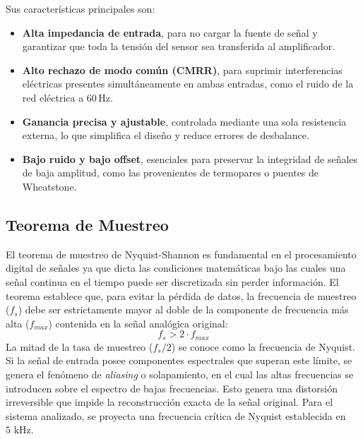 \documentclass[journal, onecolumn]{IEEEtran}
\begin{document}
Sus características principales son:

\begin{itemize}
    \item \textbf{Alta impedancia de entrada}, para no cargar la fuente de señal 
    y garantizar que toda la tensión del sensor sea transferida al amplificador.
    \item \textbf{Alto rechazo de modo común (CMRR)}, para suprimir interferencias 
    eléctricas presentes simultáneamente en ambas entradas, como el ruido de la 
    red eléctrica a 60\,Hz.
    \item \textbf{Ganancia precisa y ajustable}, controlada mediante una sola 
    resistencia externa, lo que simplifica el diseño y reduce errores de 
    desbalance.
    \item \textbf{Bajo ruido y bajo offset}, esenciales para preservar la 
    integridad de señales de baja amplitud, como las provenientes de termopares 
    o puentes de Wheatstone.
\end{itemize}

\subsection{Teorema de Muestreo}
El teorema de muestreo de Nyquist-Shannon es fundamental en el procesamiento digital de señales ya que dicta las condiciones matemáticas bajo las cuales una señal continua en el tiempo puede ser discretizada sin perder información. El teorema establece que, para evitar la pérdida de datos, la frecuencia de muestreo ($f_s$) debe ser estrictamente mayor al doble de la componente de frecuencia más alta ($f_{max}$) contenida en la señal analógica original:
\begin{equation}
    f_s > 2 \cdot f_{max}
\end{equation}
La mitad de la tasa de muestreo ($f_s / 2$) se conoce como la frecuencia de Nyquist. Si la señal de entrada posee componentes espectrales que superan este límite, se genera el fenómeno de \textit{aliasing} o solapamiento, en el cual las altas frecuencias se introducen sobre el espectro de bajas frecuencias. Esto genera una distorsión irreversible que impide la reconstrucción exacta de la señal original. Para el sistema analizado, se proyecta una frecuencia crítica de Nyquist establecida en $5\text{ kHz}$.
\end{document}
